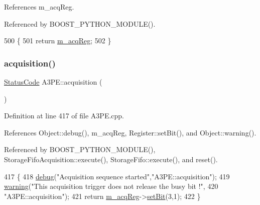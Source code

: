 References m\+\_\+acq\+Reg.



Referenced by B\+O\+O\+S\+T\+\_\+\+P\+Y\+T\+H\+O\+N\+\_\+\+M\+O\+D\+U\+L\+E().


\begin{DoxyCode}
500                     \{
501     \textcolor{keywordflow}{return} \hyperlink{classA3PE_abaf426f4c9192537117b77f9f4821e04}{m\_acqReg};
502   \}
\end{DoxyCode}
\mbox{\label{classA3PE_a035886b99761cc4f3c342ff0b4e44f59}} 
\subsubsection{\texorpdfstring{acquisition()}{acquisition()}}
{\footnotesize\ttfamily \hyperlink{classStatusCode}{Status\+Code} A3\+P\+E\+::acquisition (\begin{DoxyParamCaption}{ }\end{DoxyParamCaption})}



Definition at line 417 of file A3\+P\+E.\+cpp.



References Object\+::debug(), m\+\_\+acq\+Reg, Register\+::set\+Bit(), and Object\+::warning().



Referenced by B\+O\+O\+S\+T\+\_\+\+P\+Y\+T\+H\+O\+N\+\_\+\+M\+O\+D\+U\+L\+E(), Storage\+Fifo\+Acquisition\+::execute(), Storage\+Fifo\+::execute(), and reset().


\begin{DoxyCode}
417                             \{
418   \hyperlink{classObject_aac010553f022165573714b7014a15f0d}{debug}(\textcolor{stringliteral}{"Acquisition sequence started"},\textcolor{stringliteral}{"A3PE::acquisition"});
419   \hyperlink{classObject_a65cd4fda577711660821fd2cd5a3b4c9}{warning}(\textcolor{stringliteral}{"This acquisition trigger does not release the busy bit !"},
420       \textcolor{stringliteral}{"A3PE::acquisition"});
421   \textcolor{keywordflow}{return} \hyperlink{classA3PE_abaf426f4c9192537117b77f9f4821e04}{m\_acqReg}->\hyperlink{classRegister_ab094246dd12aa7e0aa0ca917f4e70b31}{setBit}(3,1);
422 \}
\end{DoxyCode}
\mbox{\label{classAttrib_a235f773af19c900264a190b00a3b4ad7}} 
